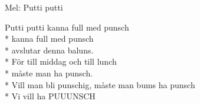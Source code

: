 \begin{SongText}
    \begin{SongInfo}
        Mel: Putti putti
    \end{SongInfo}
    \begin{SongVerse}
        Putti putti kanna full med punsch\\*%
        kanna full med punsch\\*%
        avslutar denna baluns.\\*%
        För till middag och till lunch\\*%
        måste man ha punsch.\\*%
        Vill man bli punschig, måste man bums ha punsch\\*%
        Vi vill ha PUUUNSCH
    \end{SongVerse}\end{SongText}